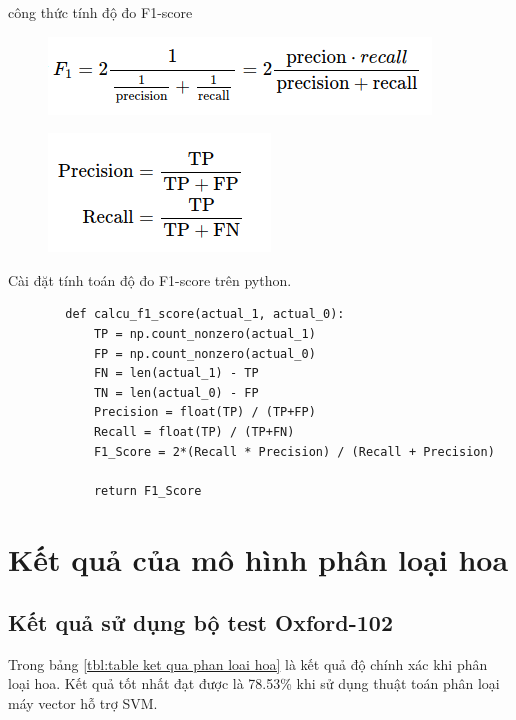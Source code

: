\documentclass[12pt]{report}
\begin{document}
		công thức tính độ đo F1-score \cite{cia_f1_score}	
		\begin{figure}[h]
			\centering
			\includegraphics[scale=1]{f1score}
		\end{figure}
		
		\begin{figure}[h]
			\centering
			\includegraphics[scale=1]{percision}
		\end{figure}
		
		Cài đặt tính toán độ đo F1-score trên python.
		\begin{lstlisting}
		def calcu_f1_score(actual_1, actual_0):
			TP = np.count_nonzero(actual_1)
			FP = np.count_nonzero(actual_0)
			FN = len(actual_1) - TP
			TN = len(actual_0) - FP
			Precision = float(TP) / (TP+FP)
			Recall = float(TP) / (TP+FN)
			F1_Score = 2*(Recall * Precision) / (Recall + Precision)

			return F1_Score
		\end{lstlisting}
		
				
				
				
		\section{Kết quả của mô hình phân loại hoa}
		\subsection{Kết quả sử dụng bộ test Oxford-102}
		Trong bảng \ref{tbl:table ket qua phan loai hoa} là kết quả độ chính xác khi phân loại hoa.
		Kết quả tốt nhất đạt được là 78.53\% khi sử dụng thuật toán phân loại máy vector hỗ trợ SVM.

		
\end{document}
